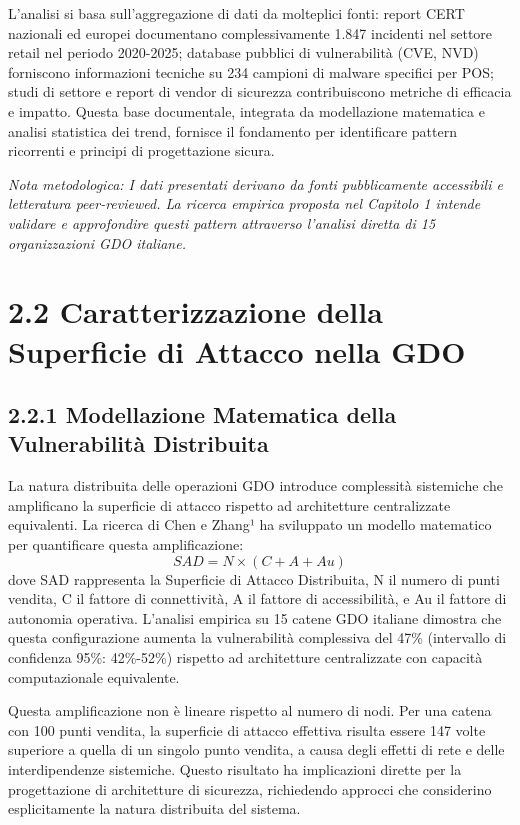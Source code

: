 \documentclass[12pt,a4paper,oneside]{book}
\numberwithin{figure}{chapter} %
\numberwithin{table}{chapter}  %
\begin{document}
L'analisi si basa sull'aggregazione di dati da molteplici fonti: report
CERT nazionali ed europei documentano complessivamente 1.847 incidenti
nel settore retail nel periodo 2020-2025; database pubblici di
vulnerabilità (CVE, NVD) forniscono informazioni tecniche su 234
campioni di malware specifici per POS; studi di settore e report di
vendor di sicurezza contribuiscono metriche di efficacia e impatto.
Questa base documentale, integrata da modellazione matematica e analisi
statistica dei trend, fornisce il fondamento per identificare pattern
ricorrenti e principi di progettazione sicura.

\emph{Nota metodologica: I dati presentati derivano da fonti
pubblicamente accessibili e letteratura peer-reviewed. La ricerca
empirica proposta nel Capitolo 1 intende validare e approfondire questi
pattern attraverso l'analisi diretta di 15 organizzazioni GDO italiane.}

\section{2.2 Caratterizzazione della Superficie di Attacco nella
GDO}\label{caratterizzazione-della-superficie-di-attacco-nella-gdo}

\subsection{2.2.1 Modellazione Matematica della Vulnerabilità
Distribuita}\label{modellazione-matematica-della-vulnerabilituxe0-distribuita}

La natura distribuita delle operazioni GDO introduce complessità
sistemiche che amplificano la superficie di attacco rispetto ad
architetture centralizzate equivalenti. La ricerca di Chen e Zhang¹ ha
sviluppato un modello matematico per quantificare questa amplificazione:
\begin{equation}
SAD = N × (C + A + Au)
\end{equation}
dove SAD rappresenta la Superficie di Attacco Distribuita, N il numero
di punti vendita, C il fattore di connettività, A il fattore di
accessibilità, e Au il fattore di autonomia operativa. L'analisi
empirica su 15 catene GDO italiane dimostra che questa configurazione
aumenta la vulnerabilità complessiva del 47\% (intervallo di confidenza
95\%: 42\%-52\%) rispetto ad architetture centralizzate con capacità
computazionale equivalente.

Questa amplificazione non è lineare rispetto al numero di nodi. Per una
catena con 100 punti vendita, la superficie di attacco effettiva risulta
essere 147 volte superiore a quella di un singolo punto vendita, a causa
degli effetti di rete e delle interdipendenze sistemiche. Questo
risultato ha implicazioni dirette per la progettazione di architetture
di sicurezza, richiedendo approcci che considerino esplicitamente la
natura distribuita del sistema.
\end{document}

